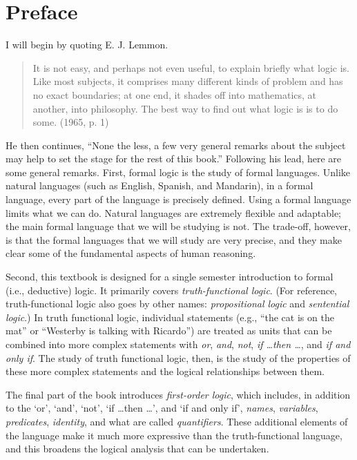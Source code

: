\chapter{Preface}

I will begin by quoting E. J. Lemmon.
\begin{quote}
It is not easy, and perhaps not even useful, to explain briefly what logic is. Like most subjects, it comprises many different kinds of problem and has no exact boundaries; at one end, it shades off into mathematics, at another, into philosophy. The best way to find out what logic is is to do some. (1965, p. 1)
\end{quote}
He then continues, ``None the less, a few very general remarks about the subject may help to set the stage for the rest of this book.'' Following his lead, here are some general remarks. First, formal logic is the study of formal languages. Unlike natural languages (such as English, Spanish, and Mandarin), in a formal language, every part of the language is precisely defined. Using a formal language limits what we can do. Natural languages are extremely flexible and adaptable; the main formal language that we will be studying is not. The trade-off, however, is that the formal languages that we will study are very precise, and they make clear some of the fundamental aspects of human reasoning.

Second, this textbook is designed for a single semester introduction to formal (i.e., deductive) logic. It primarily covers \textit{truth-functional logic}. (For reference, truth-functional logic also goes by other names: \textit{propositional logic} and \textit{sentential logic}.) In truth functional logic, individual statements (e.g., ``the cat is on the mat'' or ``Westerby is talking with Ricardo'') are treated as units that can be combined into more complex statements with  \textit{or}, \textit{and}, \textit{not}, \textit{if \ldots then \ldots}, and \textit{if and only if}. The study of truth functional logic, then, is the study of the properties of these more complex statements and the logical relationships between them. 

The final part of the book introduces \textit{first-order logic}, which includes, in addition to the ‘or’, ‘and’, ‘not’, ‘if \ldots then \ldots’, and `if and only if', \textit{names}, \textit{variables}, \textit{predicates}, \textit{identity}, and what are called \textit{quantifiers}. These additional elements of the language make it much more expressive than the truth-functional language, and this broadens the logical analysis that can be undertaken. 

